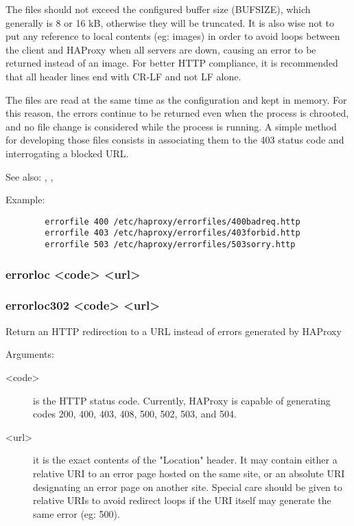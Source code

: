   The files should not exceed the configured buffer size (BUFSIZE), which
  generally is 8 or 16 kB, otherwise they will be truncated. It is also wise
  not to put any reference to local contents (eg: images) in order to avoid
  loops between the client and HAProxy when all servers are down, causing an
  error to be returned instead of an image. For better HTTP compliance, it is
  recommended that all header lines end with CR-LF and not LF alone.

  The files are read at the same time as the configuration and kept in memory.
  For this reason, the errors continue to be returned even when the process is
  chrooted, and no file change is considered while the process is running. A
  simple method for developing those files consists in associating them to the
  403 status code and interrogating a blocked URL.

  See also: , , 

  Example:
  \begin{verbatim}
        errorfile 400 /etc/haproxy/errorfiles/400badreq.http
        errorfile 403 /etc/haproxy/errorfiles/403forbid.http
        errorfile 503 /etc/haproxy/errorfiles/503sorry.http
  \end{verbatim}

\subsubsection[errorloc]{errorloc <code> <url>}
\subsubsection[errorloc302]{errorloc302 <code> <url>}
  Return an HTTP redirection to a URL instead of errors generated by HAProxy
  
  
  Arguments:
  \begin{description}
  \item[<code>]    is the HTTP status code. Currently, HAProxy is capable of
              generating codes 200, 400, 403, 408, 500, 502, 503, and 504.

  \item[<url>]     it is the exact contents of the "Location" header. It may contain
              either a relative URI to an error page hosted on the same site,
              or an absolute URI designating an error page on another site.
              Special care should be given to relative URIs to avoid redirect
              loops if the URI itself may generate the same error (eg: 500).
  \end{description}

